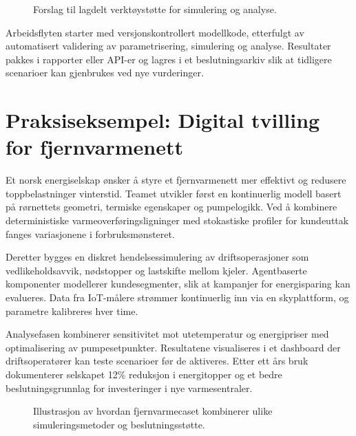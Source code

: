\begin{figure}[htbp]
    \centering
    \caption{Forslag til lagdelt verktøystøtte for simulering og analyse.}
    \label{fig:kap04-verktoystakk}
\end{figure}

Arbeidsflyten starter med versjonskontrollert modellkode, etterfulgt av automatisert validering av parametrisering, simulering og analyse. Resultater pakkes i rapporter eller API-er og lagres i et beslutningsarkiv slik at tidligere scenarioer kan gjenbrukes ved nye vurderinger.

\section{Praksiseksempel: Digital tvilling for fjernvarmenett}
Et norsk energiselskap ønsker å styre et fjernvarmenett mer effektivt og redusere toppbelastninger vinterstid. Teamet utvikler først en kontinuerlig modell basert på rørnettets geometri, termiske egenskaper og pumpelogikk. Ved å kombinere deterministiske varmeoverføringsligninger med stokastiske profiler for kundeuttak fanges variasjonene i forbruksmønsteret.

Deretter bygges en diskret hendelsessimulering av driftsoperasjoner som vedlikeholdsavvik, nødstopper og lastskifte mellom kjeler. Agentbaserte komponenter modellerer kundesegmenter, slik at kampanjer for energisparing kan evalueres. Data fra IoT-målere strømmer kontinuerlig inn via en skyplattform, og parametre kalibreres hver time.

Analysefasen kombinerer sensitivitet mot utetemperatur og energipriser med optimalisering av pumpesetpunkter. Resultatene visualiseres i et dashboard der driftsoperatører kan teste scenarioer før de aktiveres. Etter ett års bruk dokumenterer selskapet 12\% reduksjon i energitopper og et bedre beslutningsgrunnlag for investeringer i nye varmesentraler.

\begin{figure}[htbp]
    \centering
    \caption{Illustrasjon av hvordan fjernvarmecaset kombinerer ulike simuleringsmetoder og beslutningsstøtte.}
    \label{fig:kap04-fjernvarmecase}
\end{figure}

